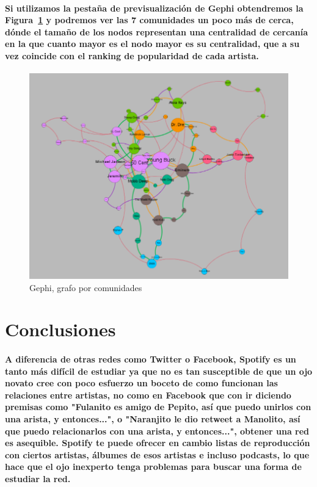 \documentclass[11pt,spanish]{article}
\begin{document}
\paragraph*{Si utilizamos la pestaña de previsualización de Gephi obtendremos la Figura~\ref{fig:gephi_bonito} y podremos ver las 7 comunidades un poco más de cerca, 
dónde el tamaño de los nodos representan una centralidad de cercanía en la que cuanto mayor es el nodo mayor es su centralidad, que a su vez coincide con el ranking de popularidad de cada artista.}

\begin{figure}[h!]
    \centering
    \includegraphics[width=150mm]{gephi_grafo_bonito.png}
    \caption{Gephi, grafo por comunidades}\label{fig:gephi_bonito}
\end{figure}
\pagebreak

\section{Conclusiones}

\paragraph*{A diferencia de otras redes como Twitter o Facebook, Spotify es un tanto más difícil de estudiar ya que no es tan susceptible de que un ojo novato cree con poco esfuerzo un boceto de como funcionan las relaciones entre artistas, 
no como en Facebook que con ir diciendo premisas como "Fulanito es amigo de Pepito, así que puedo unirlos con una arista, y entonces...", o "Naranjito le dio retweet a Manolito, así que puedo relacionarlos con una arista, y entonces...", obtener una red es asequible. Spotify te puede ofrecer en cambio listas de reproducción con ciertos artistas, álbumes de esos artistas e incluso podcasts, lo que hace que el ojo inexperto tenga problemas para buscar una forma de estudiar la red. }
\end{document}
